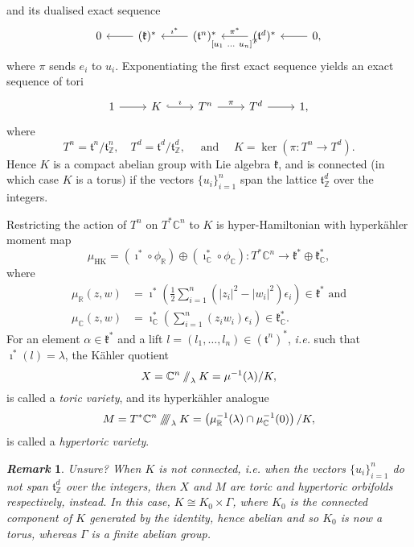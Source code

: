 \documentclass{amsart}
\newtheorem{remark}{\it Remark\/}
\newcommand{\ie}{\emph{i.e.} }
\newcommand{\ra}{\rightarrow}
\newcommand{\e}{\epsilon}
\newcommand{\RR}{\mathbb{R}}
\newcommand{\CC}{\mathbb{C}}
\newcommand{\ZZ}{\mathbb{Z}}
\newcommand{\mfk}{\mathfrak{k}}
\newcommand{\mft}{\mathfrak{t}}
\newcommand{\sslash}{\mathbin{/\mkern-6mu/}}
\newcommand{\sssslash}{\mathbin{/\mkern-6mu/\mkern-6mu/\mkern-6mu/}}
\newcommand{\tuple}[2]{(#1, \ldots, #2)}
\newcommand{\half}{\frac{1}{2}}
\DeclareMathOperator{\HK}{HK}
\begin{document}
	and its dualised exact sequence
	\[
		\begin{tikzcd}[ampersand replacement=\&]
			0 \& \ar[l]	(\mfk)^{\ast} \& \ar[l, "\imath^{\ast}", swap] (\mft^{n})^{\ast} \& \arrow{l}{[u_{1}\ \ldots \ u_{n}]^{T}}[swap]{\pi^{\ast}} (\mft^{d})^{\ast} \& \ar[l] 0,
		\end{tikzcd}
	\]
	where $\pi$ sends $e_{i}$ to $u_{i}$. Exponentiating the first exact sequence yields an exact sequence of tori
	\[
		\begin{tikzcd}[ampersand replacement=\&]
			1 \ar[r] \&	K \ar[r, hook, "\imath"] \& T^{n} \arrow{r}{\pi} \& T^{d} \ar[r] \& 1,
		\end{tikzcd}
	\]
	where 
	\[
		T^{n} = \mft^{n}/\mft_{\ZZ}^{n}, \quad T^{d} = \mft^{d}/\mft_{\ZZ}^{d}, \quad \text{ and } \quad K = \ker(\pi : T^{n} \ra T^{d}).
	\]
	Hence $K$ is a compact abelian group with Lie algebra $\mfk$, and is connected (in which case $K$ is a torus) if the vectors $\{u_{i}\}_{i=1}^{n}$ span the lattice $\mft_{\ZZ}^{d}$ over the integers.
	
	Restricting the action of $T^{n}$ on $T^{\ast}\CC^{n}$ to $K$ is hyper-Hamiltonian with hyperk\"ahler moment map
	\[
		\mu_{\HK} = (\imath^{\ast} \circ \phi_{\RR}) \oplus (\imath_{\CC}^{\ast} \circ \phi_{\CC}) : T^{\ast}\CC^{n} \ra \mfk^{\ast} \oplus \mfk_{\CC}^{\ast},
	\]
	where
	\begin{align*}%
		\mu_{\RR}(z,w) &= \imath^{\ast}\left( \half \sum_{i=1}^{n}(|z_{i}|^{2} - |w_{i}|^{2})\e_{i} \right) \in \mfk^{\ast}
		\mbox{ and}\\
		\mu_{\CC}(z,w) &= \imath_{\CC}^{\ast} \left(\sum_{i=1}^{n}(z_{i}w_{i})\e_{i} \right) \in \mfk_{\CC}^{\ast}.
	\end{align*}
	For an element $\alpha\in \mfk^{\ast}$ and a lift $l = \tuple{l_{1}}{l_{n}} \in (\mft^{n})^{\ast}$, \ie such that $\imath^{\ast}(l) = \lambda$, the K\"ahler quotient
	\[
		X = \CC^{n} \sslash_{\lambda} K = \mu^{-1}(\lambda)/K,
	\]
	is called a \emph{toric variety}, and its hyperk\"ahler analogue
	\[
		M = T^{\ast}\CC^{n} \sssslash_{\lambda} K = \left(\mu_{\RR}^{-1}(\lambda) \cap \mu_{\CC}^{-1}(0)\right)/ K,
	\]
	is called a \emph{hypertoric variety}.
	
    \begin{remark}{Unsure?}
        \break
        When $K$ is not connected, \ie when the vectors $\{u_{i}\}_{i=1}^{n}$ \emph{do not} span $\mft_{\ZZ}^{d}$ over the integers, then $X$ and $M$ are toric and hypertoric \emph{orbifolds} respectively, instead. In this case, $K \cong K_{0} \times \Gamma$, where $K_{0}$ is the connected component of $K$ generated by the identity, hence abelian and so $K_{0}$ is now a torus, whereas $\Gamma$ is a finite abelian group.
    \end{remark}
	
\end{document}
